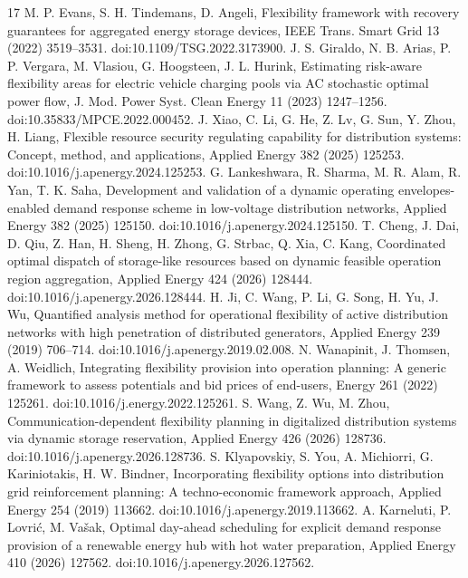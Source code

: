 \documentclass[11pt]{article}
\begin{document}
{\small
\begin{thebibliography}{17}
 M. P. Evans, S. H. Tindemans, D. Angeli, Flexibility framework with recovery guarantees for aggregated energy storage devices, IEEE Trans. Smart Grid 13 (2022) 3519--3531. doi:10.1109/TSG.2022.3173900.
 J. S. Giraldo, N. B. Arias, P. P. Vergara, M. Vlasiou, G. Hoogsteen, J. L. Hurink, Estimating risk-aware flexibility areas for electric vehicle charging pools via AC stochastic optimal power flow, J. Mod. Power Syst. Clean Energy 11 (2023) 1247--1256. doi:10.35833/MPCE.2022.000452.
 J. Xiao, C. Li, G. He, Z. Lv, G. Sun, Y. Zhou, H. Liang, Flexible resource security regulating capability for distribution systems: Concept, method, and applications, Applied Energy 382 (2025) 125253. doi:10.1016/j.apenergy.2024.125253.
 G. Lankeshwara, R. Sharma, M. R. Alam, R. Yan, T. K. Saha, Development and validation of a dynamic operating envelopes-enabled demand response scheme in low-voltage distribution networks, Applied Energy 382 (2025) 125150. doi:10.1016/j.apenergy.2024.125150.
 T. Cheng, J. Dai, D. Qiu, Z. Han, H. Sheng, H. Zhong, G. Strbac, Q. Xia, C. Kang, Coordinated optimal dispatch of storage-like resources based on dynamic feasible operation region aggregation, Applied Energy 424 (2026) 128444. doi:10.1016/j.apenergy.2026.128444.
 H. Ji, C. Wang, P. Li, G. Song, H. Yu, J. Wu, Quantified analysis method for operational flexibility of active distribution networks with high penetration of distributed generators, Applied Energy 239 (2019) 706--714. doi:10.1016/j.apenergy.2019.02.008.
 N. Wanapinit, J. Thomsen, A. Weidlich, Integrating flexibility provision into operation planning: A generic framework to assess potentials and bid prices of end-users, Energy 261 (2022) 125261. doi:10.1016/j.energy.2022.125261.
 S. Wang, Z. Wu, M. Zhou, Communication-dependent flexibility planning in digitalized distribution systems via dynamic storage reservation, Applied Energy 426 (2026) 128736. doi:10.1016/j.apenergy.2026.128736.
 S. Klyapovskiy, S. You, A. Michiorri, G. Kariniotakis, H. W. Bindner, Incorporating flexibility options into distribution grid reinforcement planning: A techno-economic framework approach, Applied Energy 254 (2019) 113662. doi:10.1016/j.apenergy.2019.113662.
 A. Karneluti, P. Lovri\'{c}, M. Va\v{s}ak, Optimal day-ahead scheduling for explicit demand response provision of a renewable energy hub with hot water preparation, Applied Energy 410 (2026) 127562. doi:10.1016/j.apenergy.2026.127562.

\end{thebibliography}}
\end{document}
